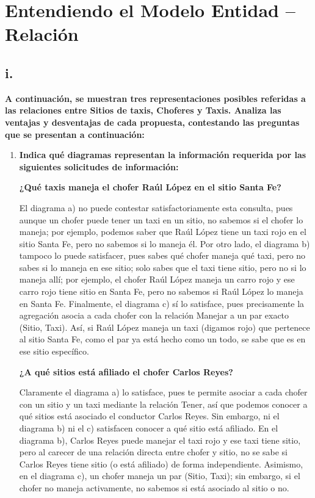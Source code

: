 \section{Entendiendo el Modelo Entidad – Relación}
\subsection*{i. }

\textbf{A continuación, se muestran tres representaciones posibles referidas a las relaciones entre Sitios de taxis, Choferes y Taxis. Analiza las ventajas y desventajas de cada propuesta, contestando las preguntas que se presentan a continuación:}
\begin{enumerate}
    \item \textbf{Indica qué diagramas representan la información requerida por las siguientes solicitudes de información:}

    \textbf{¿Qué taxis maneja el chofer Raúl López en el sitio Santa Fe?}

    El diagrama a) no puede contestar satisfactoriamente esta consulta, pues aunque un chofer puede tener un taxi en un sitio, no sabemos si el chofer lo maneja; por ejemplo, podemos saber que Raúl López tiene un taxi rojo en el sitio Santa Fe, pero no sabemos si lo maneja él. Por otro lado, el diagrama b) tampoco lo puede satisfacer, pues sabes qué chofer maneja qué taxi, pero no sabes si lo maneja en ese sitio; solo sabes que el taxi tiene sitio, pero no si lo maneja allí; por ejemplo, el chofer Raúl López maneja un carro rojo y ese carro rojo tiene sitio en Santa Fe, pero no sabemos si Raúl López lo maneja en Santa Fe. Finalmente, el diagrama c) sí lo satisface, pues precisamente la agregación asocia a cada chofer con la relación Manejar a un par exacto (Sitio, Taxi). Así, si Raúl López maneja un taxi (digamos rojo) que pertenece al sitio Santa Fe, como el par ya está hecho como un todo, se sabe que es en ese sitio específico.

    \textbf{¿A qué sitios está afiliado el chofer Carlos Reyes?}

    Claramente el diagrama a) lo satisface, pues te permite asociar a cada chofer con un sitio y un taxi mediante la relación Tener, así que podemos conocer a qué sitios está asociado el conductor Carlos Reyes. Sin embargo, ni el diagrama b) ni el c) satisfacen conocer a qué sitio está afiliado. En el diagrama b), Carlos Reyes puede manejar el taxi rojo y ese taxi tiene sitio, pero al carecer de una relación directa entre chofer y sitio, no se sabe si Carlos Reyes tiene sitio (o está afiliado) de forma independiente. Asimismo, en el diagrama c), un chofer maneja un par (Sitio, Taxi); sin embargo, si el chofer no maneja activamente, no sabemos si está asociado al sitio o no.


\end{enumerate}
